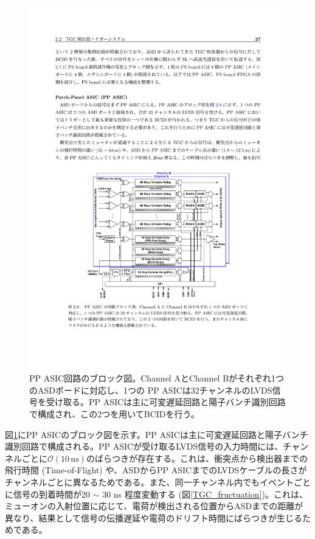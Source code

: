     \begin{figure} 
    \centering
    \includegraphics[width=16cm]{fig/Intro/TGC_PPASIC.pdf}
    \caption[PP ASIC回路のブロック図]{PP ASIC回路のブロック図\cite{PPASIC}。Channel AとChannel Bがそれぞれ1つのASDボードに対応し、1つの PP ASICは32チャンネルのLVDS信号を受け取る。PP ASICは主に可変遅延回路と陽子バンチ識別回路で構成され、この2つを用いてBCIDを行う。}
    \label{TGC_PPASIC}
    \end{figure}

    図\ref{TGC_PPASIC}にPP ASICのブロック図を示す。PP ASICは主に可変遅延回路と陽子バンチ識別回路で構成される。PP ASICが受け取るLVDS信号の入力時間には、チャンネルごとに$\mathcal{O}(10\,\mathrm{ns})$のばらつきが存在する。これは、衝突点から検出器までの飛行時間 (Time-of-Flight) や、ASDからPP ASICまでのLVDSケーブルの長さがチャンネルごとに異なるためである。また、同一チャンネル内でもイベントごとに信号の到着時間が20 $\sim$ 30 ns 程度変動する (図\ref{TGC_fructuation})。これは、ミューオンの入射位置に応じて、電荷が検出される位置からASDまでの距離が異なり、結果として信号の伝播遅延や電荷のドリフト時間にばらつきが生じるためである。

